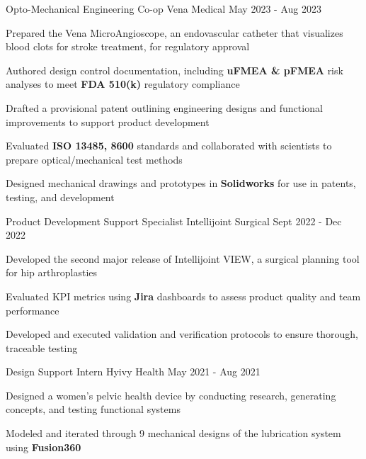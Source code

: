 \documentclass[11pt, a4paper]{russell}
\begin{document}
\begin{cventries}
\cventry
  {Opto-Mechanical Engineering Co-op} %
  {Vena Medical} %
  {} %
  {May 2023 - Aug 2023} %
  {
    \begin{cvitems}
        \item {Prepared the Vena MicroAngioscope, an endovascular catheter that visualizes blood clots for stroke treatment, for regulatory approval}
        \item {Authored design control documentation, including\textbf{ uFMEA \& pFMEA} risk analyses to meet \textbf{FDA 510(k)} regulatory compliance}
        \item {Drafted a provisional patent outlining engineering designs and functional improvements to support product development}
        \item {Evaluated \textbf{ISO 13485, 8600} standards and collaborated with scientists to prepare optical/mechanical test methods}
        \item {Designed mechanical drawings and prototypes in \textbf{Solidworks} for use in patents, testing, and development}
    \end{cvitems}
  }

\cventry
  {Product Development Support Specialist} %
  {Intellijoint Surgical} %
  {} %
  {Sept 2022 - Dec 2022} %
  {
    \begin{cvitems}
        \item {Developed the second major release of Intellijoint VIEW, a surgical planning tool for hip arthroplasties}
        \item {Evaluated KPI metrics using \textbf{Jira} dashboards to assess product quality and team performance}
        \item {Developed and executed validation and verification protocols to ensure thorough, traceable testing}
    \end{cvitems}
  }

\cventry
  {Design Support Intern} %
  {Hyivy Health} %
  {} %
  {May 2021 - Aug 2021} %
  {
    \begin{cvitems}
        \item {Designed a women's pelvic health device by conducting research, generating concepts, and testing functional systems}
        \item {Modeled and iterated through 9 mechanical designs of the lubrication system using \textbf{Fusion360}}
    \end{cvitems}
  }
\end{cventries}
\end{document}
